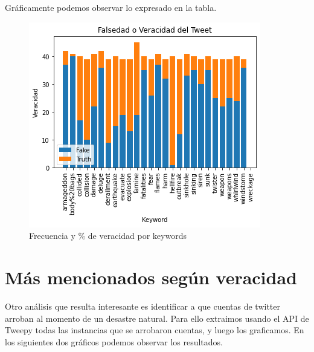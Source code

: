 \documentclass[]{article}
\begin{document}
Gráficamente podemos observar lo expresado en la tabla.  \\

 \begin{figure}[H]
	
	\includegraphics[width=1.0\linewidth]{keyword3}
	\caption[]{Frecuencia y \% de veracidad por keywords}
\end{figure}

\section{Más mencionados según veracidad}

Otro an\'alisis que resulta interesante es identificar a que cuentas de twitter arroban al momento de un desastre natural. Para ello extraimos usando el API de Tweepy todas las instancias que se arrobaron cuentas, y luego los graficamos. En los siguientes dos gr\'aficos podemos observar los resultados. 
\end{document}
